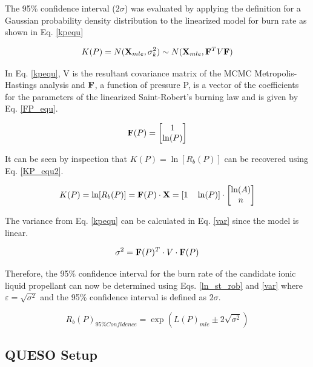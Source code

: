 \documentclass{article}
\begin{document}
The 95\% confidence interval ($2\sigma$) was evaluated by applying the definition for a Gaussian probability density distribution 
to the linearized model for burn rate as shown in Eq. \ref{kpequ}

\begin{equation} \label{kpequ}
K(P)=N(\mathbf{X}_{mle},\sigma_k^2) \sim N(\mathbf{X}_{mle}, \mathbf{F}^T V \mathbf{F})
\end{equation}

In Eq. \ref{kpequ}, V is the resultant covariance matrix of the MCMC Metropolis-Hastings analysis and $\mathbf{F}$, a function of
pressure P, is a vector of the coefficients for the parameters of the linearized Saint-Robert's burning law and is given by
Eq. \ref{FP_equ}.

\begin{equation} \label{FP_equ}
\mathbf{F}(P)= 
\begin{bmatrix}
1 \\ 
\ln(P)
\end{bmatrix}
\end{equation}

It can be seen by inspection that $K(P) = \ln[R_b(P)]$ can be recovered using Eq. \ref{KP_equ2}.

\begin{equation} \label{KP_equ2}
K(P) = \ln[R_b(P)] = \mathbf{F}(P) \cdot \mathbf{X} = [1 \quad \ln(P)] \cdot 
\begin{bmatrix}
\ln(A) \\ 
n
\end{bmatrix}
\end{equation}

The variance from Eq. \ref{kpequ} can be calculated in Eq. \ref{var} since the model is linear.

\begin{equation} \label{var}
\sigma^2 = \mathbf{F}(P)^T \cdot V \cdot \mathbf{F}(P)
\end{equation}

Therefore, the 95\% confidence interval for the burn rate of the candidate ionic liquid propellant can now be determined
using Eqs. \ref{ln_st_rob} and \ref{var} where $\varepsilon = \sqrt{\sigma^2}$ and the 95\% confidence interval is 
defined as $2\sigma$.

\begin{equation} \label{Rb95}
R_b(P)_{95\% Confidence} = \exp{(L(P)_{mle} \pm 2 \sqrt{\sigma^2})}
\end{equation}

\subsection{QUESO Setup} \label{QUESO_setup}
\end{document}
